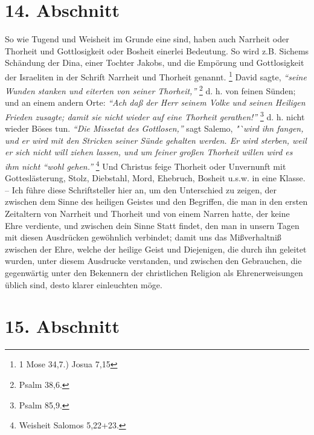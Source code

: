\section{14. Abschnitt} \label{kap9_ab14}

So wie Tugend und Weisheit im Grunde eine sind, haben auch Narrheit oder
Thorheit und Gottlosigkeit oder Bosheit einerlei Bedeutung. So wird z.B.
Sichems Schändung der Dina, einer Tochter Jakobs, und die Empörung und
Gottlosigkeit der Israeliten in der Schrift Narrheit und Thorheit
genannt.
\footnote{1 Mose 34,7.) Josua 7,15}
David sagte,
\textit{"`seine Wunden stanken
und eiterten von seiner Thorheit,"'}
\footnote{Psalm 38,6.}
d. h. von feinen Sünden;
und an einem andern Orte:
\textit{"`Ach daß der Herr seinem Volke und seinen Heiligen
Frieden zusagte; damit sie nicht wieder auf eine Thorheit
gerathen!"'}
\footnote{Psalm 85,9.}
d. h. nicht wieder Böses tun.
\textit{"`Die Missetat des Gottlosen,"'}
sagt Salemo,
\textit{"`wird ihn fangen, und er wird mit den Stricken
seiner Sünde gehalten werden. Er wird sterben, weil er sich nicht will ziehen
lassen, und um feiner großen Thorheit willen wird es ihm nicht "`wohl
gehen."'}
\footnote{Weisheit Salomos 5,22+23.}
Und Christus feige Thorheit oder
Unvernunft mit Gotteslästerung, Stolz, Diebstahl, Mord, Ehebruch, Bosheit u.s.w. in eine Klasse. -- Ich führe diese Schriftsteller hier an, um den
Unterschied zu zeigen, der zwischen dem Sinne des heiligen Geistes und den
Begriffen, die man in den ersten Zeitaltern von Narrheit und Thorheit und von
einem Narren hatte, der keine Ehre verdiente, und zwischen dein Sinne Statt
findet, den man in unsern Tagen mit diesen Ausdrücken gewöhnlich verbindet;
damit uns das Mißverhaltniß zwischen der Ehre, welche der heilige Geist und
Diejenigen, die durch ihn geleitet wurden, unter diesem Ausdrucke verstanden,
und zwischen den Gebrauchen, die gegenwärtig unter den Bekennern der
christlichen Religion als Ehrenerweisungen üblich sind, desto klarer einleuchten
möge.
\section{15. Abschnitt} \label{kap9_ab15}

